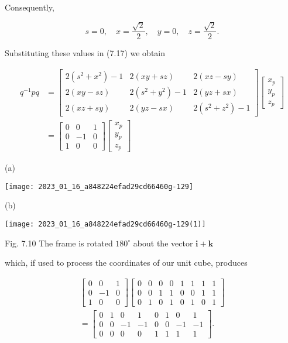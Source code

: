 Consequently,

$$
s=0, \quad x=\frac{\sqrt{2}}{2}, \quad y=0, \quad z=\frac{\sqrt{2}}{2} .
$$

Substituting these values in (7.17) we obtain

$$
\begin{aligned}
q^{-1} p q & =\left[\begin{array}{ccc}
2\left(s^{2}+x^{2}\right)-1 & 2(x y+s z) & 2(x z-s y) \\
2(x y-s z) & 2\left(s^{2}+y^{2}\right)-1 & 2(y z+s x) \\
2(x z+s y) & 2(y z-s x) & 2\left(s^{2}+z^{2}\right)-1
\end{array}\right]\left[\begin{array}{l}
x_{p} \\
y_{p} \\
z_{p}
\end{array}\right] \\
& =\left[\begin{array}{ccc}
0 & 0 & 1 \\
0 & -1 & 0 \\
1 & 0 & 0
\end{array}\right]\left[\begin{array}{l}
x_{p} \\
y_{p} \\
z_{p}
\end{array}\right]
\end{aligned}
$$

(a)

\begin{center}
\texttt{[image: 2023\_01\_16\_a848224efad29cd66460g-129]}
\end{center}

(b)

\begin{center}
\texttt{[image: 2023\_01\_16\_a848224efad29cd66460g-129(1)]}
\end{center}

Fig. 7.10 The frame is rotated $180^{\circ}$ about the vector $\mathbf{i}+\mathbf{k}$

which, if used to process the coordinates of our unit cube, produces

$$
\begin{gathered}
{\left[\begin{array}{ccc}
0 & 0 & 1 \\
0 & -1 & 0 \\
1 & 0 & 0
\end{array}\right]\left[\begin{array}{cccccccc}
0 & 0 & 0 & 0 & 1 & 1 & 1 & 1 \\
0 & 0 & 1 & 1 & 0 & 0 & 1 & 1 \\
0 & 1 & 0 & 1 & 0 & 1 & 0 & 1
\end{array}\right]} \\
=\left[\begin{array}{cccccccc}
0 & 1 & 0 & 1 & 0 & 1 & 0 & 1 \\
0 & 0 & -1 & -1 & 0 & 0 & -1 & -1 \\
0 & 0 & 0 & 0 & 1 & 1 & 1 & 1
\end{array}\right] .
\end{gathered}
$$

